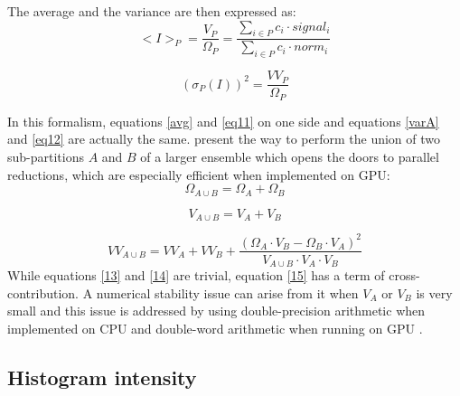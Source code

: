 \documentclass[preprint]{iucr}              %
\begin{document}
The average and the variance are then expressed as:
\begin{equation}
\label{eq11}
<I>_P = \frac{V_{P}}{\Omega_{P}} =  \frac{\sum\limits_{i \in P} c_i \cdot signal_i}
                        {\sum\limits_{i \in P} c_i \cdot norm_i} 
\end{equation}

\begin{equation}
\label{eq12}
(\sigma_P(I))^2 = \frac{VV_{P}}{\Omega_{P}}
\end{equation}

In this formalism, equations \ref{avg} and \ref{eq11} on one side and equations \ref{varA} and \ref{eq12} are actually the same.
 present the way to perform the union of two sub-partitions $A$ and $B$ of a larger ensemble which opens the doors to parallel reductions, which are especially efficient when implemented on GPU:
\begin{equation}
\label{13}
\Omega_{A \cup B} =  \Omega_{A} + \Omega_{B} 
\end{equation}

\begin{equation}
\label{14}
V_{A \cup B} =  V_{A} + V_{B} 
\end{equation}
  
\begin{equation}
\label{15}
VV_{A \cup B} =  VV_{A} + VV_{B} +  \frac{(\Omega_{A} \cdot V_{B} - \Omega_{B}\cdot V_{A})^2}{V_{A \cup B} \cdot  V_{A} \cdot V_{B}}
\end{equation}
While equations \ref{13} and \ref{14} are trivial, equation \ref{15} has a term of cross-contribution.
A numerical stability issue can arise from it when $V_A$ or $V_B$ is very small and this issue is addressed by using double-precision arithmetic when implemented on CPU and double-word arithmetic when running on GPU \cite{double_word}.

\subsection{Histogram intensity }
\end{document}
